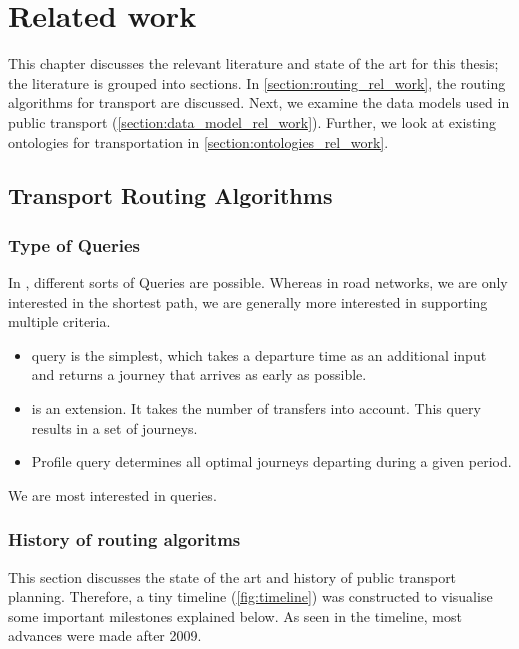 \chapter{Related work}
\label{chap:rel_work}
This chapter discusses the relevant literature and state of the art for this thesis; the literature is grouped into  sections. In \autoref{section:routing_rel_work}, the routing algorithms for transport are discussed. Next, we examine the data models used in public transport (\autoref{section:data_model_rel_work}). Further, we look at existing ontologies for transportation in \autoref{section:ontologies_rel_work}.

\section{Transport Routing Algorithms }\label{section:routing_rel_work}

\subsection{Type of Queries}
In , different sorts of Queries are possible. Whereas in road networks, we are only interested in the shortest path, we are generally more interested in supporting multiple criteria. 
\begin{itemize}
    \item {} query is the simplest, which takes a departure time as an additional input and returns a journey that arrives as early as possible.
    \item {} is an extension. It takes the number of transfers into account. This query results in a set of journeys.
    \item Profile query determines all optimal journeys departing during a given period.
\end{itemize}

We are most interested in  queries.
\subsection{History of routing algoritms}


This section discusses the state of the art and history of public transport planning. Therefore, a tiny timeline (\autoref{fig:timeline}) was constructed to visualise some important milestones explained below. As seen in the timeline, most advances were made after 2009.

